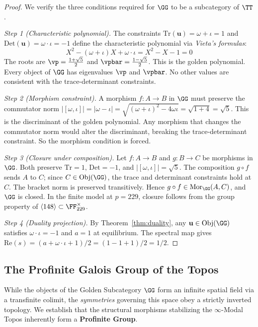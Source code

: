 \begin{proof}
We verify the three conditions required for $\GG$ to be a subcategory of $\TT$.

\emph{Step 1 (Characteristic polynomial).} The constraints $\mathrm{Tr}(\mathbf{u}) = \omega + \iota = 1$ and $\mathrm{Det}(\mathbf{u}) = \omega \cdot \iota = -1$ define the characteristic polynomial via \emph{Vieta's formulas}:
$$X^2 - (\omega + \iota)X + \omega \cdot \iota = X^2 - X - 1 = 0$$
The roots are $\vp = \frac{1 + \sqrt{5}}{2}$ and $\vpbar = \frac{1 - \sqrt{5}}{2}$. This is the golden polynomial. Every object of $\GG$ has eigenvalues $\vp$ and $\vpbar$. No other values are consistent with the trace-determinant constraints.

\emph{Step 2 (Morphism constraint).} A morphism $f : A \to B$ in $\GG$ must preserve the commutator norm $|[\omega, \iota]| = |\omega - \iota| = \sqrt{(\omega+\iota)^2 - 4\omega\iota} = \sqrt{1 + 4} = \sqrt{5}$. This is the discriminant of the golden polynomial. Any morphism that changes the commutator norm would alter the discriminant, breaking the trace-determinant constraint. So the morphism condition is forced.

\emph{Step 3 (Closure under composition).} Let $f : A \to B$ and $g : B \to C$ be morphisms in $\GG$. Both preserve $\mathrm{Tr} = 1$, $\mathrm{Det} = -1$, and $|[\omega, \iota]| = \sqrt{5}$. The composition $g \circ f$ sends $A$ to $C$; since $C \in \mathrm{Obj}(\GG)$, the trace and determinant constraints hold at $C$. The bracket norm is preserved transitively. Hence $g \circ f \in \mathrm{Mor}_{\GG}(A,C)$, and $\GG$ is closed. In the finite model at $p = 229$, closure follows from the group property of $\langle 148 \rangle \subset \FF_{229}^\times$.

\emph{Step 4 (Duality projection).} By Theorem~\ref{thm:duality}, any $\mathbf{u} \in \mathrm{Obj}(\GG)$ satisfies $\omega \cdot \iota = -1$ and $a = 1$ at equilibrium. The spectral map gives $\mathrm{Re}(s) = (a + \omega \cdot \iota + 1)/2 = (1 - 1 + 1)/2 = 1/2$. \qedhere
\end{proof}

\subsection{The Profinite Galois Group of the Topos}\label{sec:profinite}

While the objects of the Golden Subcategory $\GG$ form an infinite spatial field via a transfinite colimit, the \emph{symmetries} governing this space obey a strictly inverted topology. We establish that the structural morphisms stabilizing the $\infty$-Modal Topos inherently form a \textbf{Profinite Group}.

